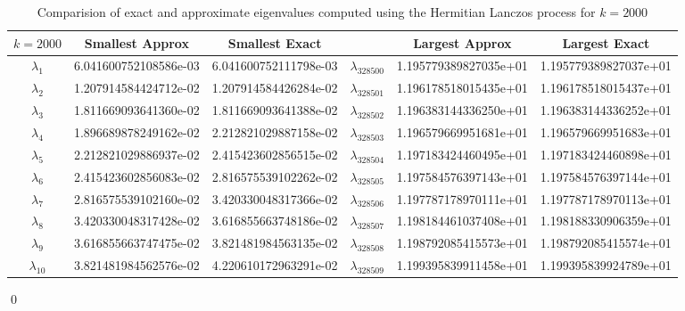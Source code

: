 \documentclass[12pt]{article}
\begin{document}
\begin{itemize}
\begin{table}[H]
\renewcommand{\arraystretch}{1.5}
\begin{small}
\hspace{-.95in}
\begin{tabular}{| c | c | c || c | c | c |}
\hline
$k = 2000$ &  \textbf{Smallest Approx} & \textbf{Smallest Exact} &   & \textbf{Largest Approx} & \textbf{Largest Exact}\\
\hline 
\hline
$\lambda_1$  & 6.041600752108586e-03  & 6.041600752111798e-03  & $\lambda_{328500}$  & 1.195779389827035e+01  &  1.195779389827037e+01 \\
$\lambda_2$  & 1.207914584424712e-02  &  1.207914584426284e-02 & $\lambda_{328501}$  & 1.196178518015435e+01  &  1.196178518015437e+01 \\
$\lambda_3$  & 1.811669093641360e-02  &  1.811669093641388e-02 & $\lambda_{328502}$  & 1.196383144336250e+01  &  1.196383144336252e+01 \\
$\lambda_4$  & 1.896689878249162e-02  & 2.212821029887158e-02  & $\lambda_{328503}$  & 1.196579669951681e+01  &  1.196579669951683e+01 \\
$\lambda_5$  & 2.212821029886937e-02  & 2.415423602856515e-02  & $\lambda_{328504}$  &  1.197183424460495e+01 &  1.197183424460898e+01 \\
$\lambda_6$  & 2.415423602856083e-02  & 2.816575539102262e-02  & $\lambda_{328505}$  & 1.197584576397143e+01  &  1.197584576397144e+01 \\
$\lambda_7$  & 2.816575539102160e-02  & 3.420330048317366e-02  & $\lambda_{328506}$  & 1.197787178970111e+01  &  1.197787178970113e+01 \\
$\lambda_8$  & 3.420330048317428e-02  & 3.616855663748186e-02  & $\lambda_{328507}$  & 1.198184461037408e+01  &  1.198188330906359e+01 \\
$\lambda_9$  & 3.616855663747475e-02  & 3.821481984563135e-02  & $\lambda_{328508}$  & 1.198792085415573e+01  &  1.198792085415574e+01 \\
$\lambda_{10}$  & 3.821481984562576e-02  & 4.220610172963291e-02  & $\lambda_{328509}$  & 1.199395839911458e+01  &  1.199395839924789e+01 \\
\hline
\end{tabular}
\end{small}
\caption{Comparision of exact and approximate eigenvalues computed using the Hermitian Lanczos process for $k = 2000$}
\end{table} 
\qed\\
\end{itemize}
\end{document}
